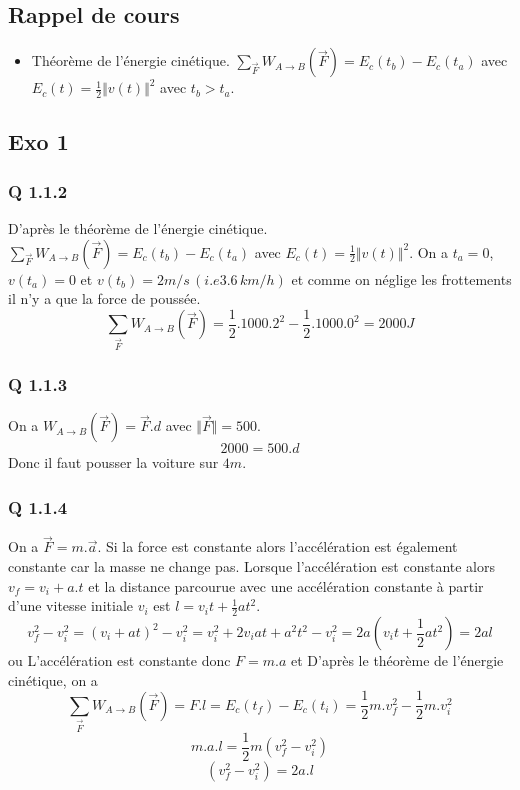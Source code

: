 \documentclass[]{book}
\theoremstyle{definition}
\begin{document}
\subsection*{Rappel de cours}
\begin{itemize}
\item Th\'eor\`eme de l'\'energie cin\'etique. $\sum_{\overrightarrow{F}} W_{A \to B}(\overrightarrow{F}) = E_c(t_b) - E_c(t_a)$ avec $E_c(t) = \frac{1}{2}\Vert v(t) \Vert^2$ avec $t_b>t_a$.
\end{itemize}


\subsection*{Exo 1}

\subsubsection*{Q 1.1.2}
D'apr\`es le th\'eor\`eme de l'\'energie cin\'etique. $\sum_{\overrightarrow{F}}W_{A \to B}(\overrightarrow{F}) = E_c(t_b) - E_c(t_a)$ avec $E_c(t) = \frac{1}{2}\Vert v(t) \Vert^2$. On a $t_a=0$, $v(t_a) = 0$ et $v(t_b) = 2m/s \,(i.e 3.6\, km/h)$ et comme on n\'eglige les frottements il n'y a que la force de pouss\'ee.\\
$$\sum_{\overrightarrow{F}}W_{A \to B}(\overrightarrow{F}) = \frac{1}{2}.1000.2^2 - \frac{1}{2}.1000.0^2 = 2000J$$

\subsubsection*{Q 1.1.3}
On a $W_{A \to B}(\overrightarrow{F}) = \overrightarrow{F}.d$ avec $\Vert \overrightarrow{F} \Vert = 500$.
$$2000 = 500.d$$
Donc il faut pousser la voiture sur $4m$.

\subsubsection*{Q 1.1.4}
On a $\overrightarrow{F} = m.\overrightarrow{a}$. Si la force est constante alors l'acc\'el\'eration est \'egalement constante car la masse ne change pas. Lorsque l'acc\'el\'eration est constante alors $v_f = v_i + a.t$ et la distance parcourue avec une acc\'el\'eration constante \`a partir d'une vitesse initiale $v_i$ est $l=v_it+\frac{1}{2}at^2$.
$$v_f^2 - v_i^2 = (v_i + at)^2 - v_i^2 = v_i^2 + 2 v_iat + a^2t^2 - v_i^2 = 2a(v_it + \frac{1}{2}at^2) = 2al$$
ou
L'acc\'el\'eration est constante donc $F = m.a$ et D'apr\`es le th\'eor\`eme de l'\'energie cin\'etique, on a
$$\sum_{\overrightarrow{F}}W_{A \to B}(\overrightarrow{F}) = F.l = E_c(t_f) - E_c(t_i) = \frac{1}{2}m.v_f^2 - \frac{1}{2}m.v_i^2$$
$$m.a.l = \frac{1}{2}m(v_f^2 - v_i^2)$$
$$(v_f^2 - v_i^2) = 2a.l$$
\end{document}

